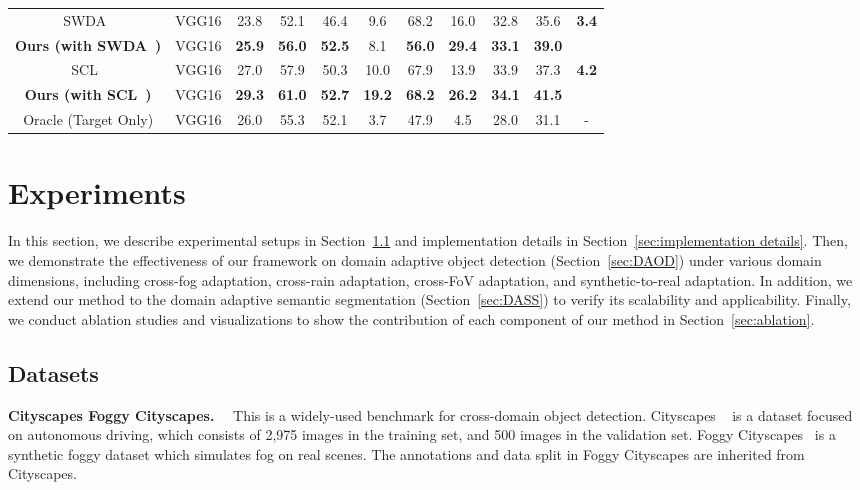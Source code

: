 \documentclass[10pt,journal,compsoc]{IEEEtran}
\renewcommand{\paragraph}[1]{\noindent\textbf{#1}~~}
\begin{document}
\begin{table*}
{{\begin{tabular}{c|c|ccccccc|c|c}
\midrule
SWDA~\cite{SWDA} & VGG16 & 23.8 & 52.1 & 46.4 & 9.6 & 68.2 & 16.0 & 32.8 & 35.6 & \multirow{2}{*}{\textbf{3.4}}\\
\textbf{Ours (with SWDA~\cite{SWDA})} & VGG16 & \textbf{25.9} & \textbf{56.0} & \textbf{52.5} & 8.1 & \textbf{56.0} & \textbf{29.4} & \textbf{33.1} & \textbf{39.0} &\\
\midrule
SCL~\cite{SCL} & VGG16 & 27.0 & 57.9 & 50.3 & 10.0 & 67.9 & 13.9 & 33.9 & 37.3 & \multirow{2}{*}{\textbf{4.2}}\\
\textbf{Ours (with SCL~\cite{SCL})} & VGG16 & \textbf{29.3} & \textbf{61.0} & \textbf{52.7} & \textbf{19.2} & \textbf{68.2} & \textbf{26.2} & \textbf{34.1} & \textbf{41.5} &\\
\midrule
Oracle (Target Only) & VGG16 &26.0  &55.3  &52.1  &3.7  &47.9  &4.5  &28.0  &31.1  &-\\
\bottomrule
\end{tabular}
}
}
\label{table:ob_comb}
\end{table*}

\section{Experiments}
In this section, we describe experimental setups in Section~\ref{sec:datasets} and implementation details in Section~\ref{sec:implementation details}. Then, we demonstrate the effectiveness of our framework on domain adaptive object detection (Section~\ref{sec:DAOD}) under various domain dimensions, including cross-fog adaptation, cross-rain adaptation, cross-FoV adaptation, and synthetic-to-real adaptation.  In addition, we extend our method to the domain adaptive semantic segmentation (Section~\ref{sec:DASS}) to verify its scalability and applicability. Finally, we conduct ablation studies and visualizations to 
show the contribution of each component of our method in Section~\ref{sec:ablation}.
 
\subsection{Datasets}
\label{sec:datasets}
\paragraph{Cityscapes  Foggy Cityscapes.} This is a widely-used benchmark for cross-domain object detection. Cityscapes ~\cite{cordts2016cityscapes} is a dataset focused on autonomous driving, which consists of 2,975 images in the training set, and 500 images in the validation set. 
Foggy  Cityscapes~\cite{FoggyCity} is a synthetic foggy dataset which simulates fog on real scenes. 
The annotations and data split in Foggy Cityscapes are inherited from Cityscapes.
\end{document}
